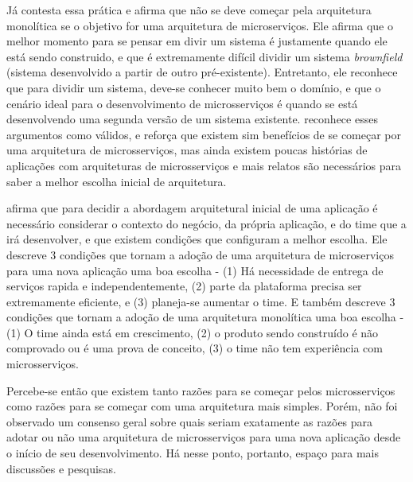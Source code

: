 Já  contesta essa prática e afirma que não se deve começar pela arquitetura monolítica se o objetivo for uma arquitetura de microserviços. Ele afirma que o melhor momento para se pensar em divir um sistema é justamente quando ele está sendo construido, e que é extremamente difícil dividir um sistema \emph{brownfield} (sistema desenvolvido a partir de outro pré-existente). Entretanto, ele reconhece que para dividir um sistema, deve-se conhecer muito bem o domínio, e que o cenário ideal para o desenvolvimento de microsserviços é quando se está desenvolvendo uma segunda versão de um sistema existente.  reconhece esses argumentos como válidos, e reforça que existem sim benefícios de se começar por uma arquitetura de microsserviços, mas ainda existem poucas histórias de aplicações com arquiteturas de microsserviços e mais relatos são necessários para saber a melhor escolha inicial de arquitetura. \cite{dontStartWithMonolith-tilkov,martin-fowler-monolith-first}


 afirma que para decidir a abordagem arquitetural inicial de uma aplicação é necessário considerar o contexto do negócio, da própria aplicação, e do time que a irá desenvolver, e que existem condições que configuram a melhor escolha. Ele descreve 3 condições que tornam a adoção de uma arquitetura de microserviços para uma nova aplicação uma boa escolha - (1) Há necessidade de entrega de serviços rapida e independentemente, (2) parte da plataforma precisa ser extremamente eficiente, e (3) planeja-se aumentar o time. E também descreve 3 condições que tornam a adoção de uma arquitetura monolítica uma boa escolha - (1) O time ainda está em crescimento, (2) o produto sendo construído é não comprovado ou é uma prova de conceito, (3) o time não tem experiência com microsserviços. \cite{monolith-or-microservices}

Percebe-se então que existem tanto razões para se começar pelos microsserviços como razões para se começar com uma arquitetura mais simples. Porém, não foi observado um consenso geral sobre quais seriam exatamente as razões para adotar ou não uma arquitetura de microsserviços para uma nova aplicação desde o início de seu desenvolvimento. Há nesse ponto, portanto, espaço para mais discussões e pesquisas.


